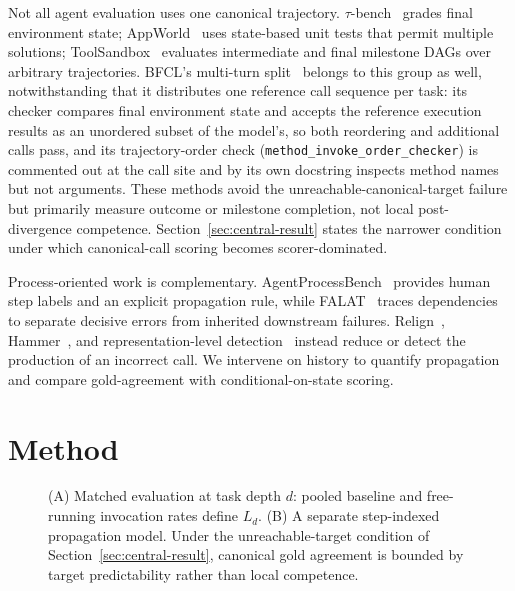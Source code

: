 \documentclass{article}
\begin{document}
Not all agent evaluation uses one canonical trajectory. $\tau$-bench~\cite{yao2024taubench} grades final environment state; AppWorld~\cite{trivedi2024appworld} uses state-based unit tests that permit multiple solutions; ToolSandbox~\cite{lu2024toolsandbox} evaluates intermediate and final milestone DAGs over arbitrary trajectories. BFCL's multi-turn split~\cite{patil2025bfcl} belongs to this group as well, notwithstanding that it distributes one reference call sequence per task: its checker compares final environment state and accepts the reference execution results as an unordered subset of the model's, so both reordering and additional calls pass, and its trajectory-order check (\texttt{method\_invoke\_order\_checker}) is commented out at the call site and by its own docstring inspects method names but not arguments. These methods avoid the unreachable-canonical-target failure but primarily measure outcome or milestone completion, not local post-divergence competence. Section~\ref{sec:central-result} states the narrower condition under which canonical-call scoring becomes scorer-dominated.

Process-oriented work is complementary. AgentProcessBench~\cite{fan2026agentprocessbench} provides human step labels and an explicit propagation rule, while FALAT~\cite{rafi2026falat} traces dependencies to separate decisive errors from inherited downstream failures. Relign~\cite{xu2025relign}, Hammer~\cite{lin2024hammer}, and representation-level detection~\cite{healy2026internal} instead reduce or detect the production of an incorrect call. We intervene on history to quantify propagation and compare gold-agreement with conditional-on-state scoring.

\section{Method}

\begin{figure}[ht]
\centering
\resizebox{0.98\textwidth}{!}{%
%
}
\caption{(A) Matched evaluation at task depth $d$: pooled baseline and free-running invocation rates define $L_d$. (B) A separate step-indexed propagation model. Under the unreachable-target condition of Section~\ref{sec:central-result}, canonical gold agreement is bounded by target predictability rather than local competence.}
\label{fig:methodology}
\end{figure}
\end{document}
